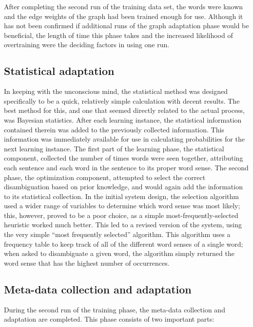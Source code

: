 After completing the second run of the training data set, the words were known and
the edge weights of the graph had been trained enough for use.  Although it has
not been confirmed if additional runs of the graph adaptation phase would be
beneficial, the length of time this phase takes and the increased likelihood
of overtraining were the deciding factors in using one run.

\subsection{Statistical adaptation}

In keeping with the unconscious mind, the statistical method was designed
specifically to be a quick, relatively simple calculation with decent results.
The best method for this, and one that seemed directly related to the actual
process, was Bayesian statistics.  After each learning instance, the statistical
information contained therein was added to the previously collected
information.  This information was immediately available for use in calculating
probabilities for the next learning instance.  The first part of the learning
phase, the statistical component, collected the number of times words were seen
together, attributing each sentence and each word in the sentence to its proper
word sense.  The second
phase, the optimization component, attempted to select
the correct disambiguation based on prior knowledge, and would again add the
information to its statistical collection.  In the initial system design, the selection algorithm 
used a wider range of variables to determine which word sense was most likely;
this, however, proved to be a poor choice, as a simple most-frequently-selected heuristic worked much better.  
This led to a revised version of the system, using the very simple
``most frequently selected'' algorithm.  This algorithm
uses a frequency table to keep track of all of the different word senses of a
single word; when asked to disambiguate a given word, the algorithm simply returned the
word sense that has the highest number of occurrences.

\subsection{Meta-data collection and adaptation}

During the second run of the training phase, the meta-data collection 
and adaptation are completed.  This phase consists of two important
parts: 

